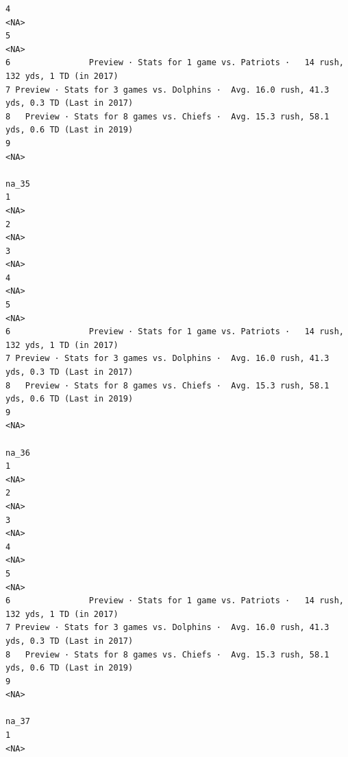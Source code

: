 \documentclass[
]{article}
\begin{document}
\begin{verbatim}
4                                                                                        <NA>
5                                                                                        <NA>
6                Preview · Stats for 1 game vs. Patriots ·   14 rush, 132 yds, 1 TD (in 2017)
7 Preview · Stats for 3 games vs. Dolphins ·  Avg. 16.0 rush, 41.3 yds, 0.3 TD (Last in 2017)
8   Preview · Stats for 8 games vs. Chiefs ·  Avg. 15.3 rush, 58.1 yds, 0.6 TD (Last in 2019)
9                                                                                        <NA>
                                                                                        na_35
1                                                                                        <NA>
2                                                                                        <NA>
3                                                                                        <NA>
4                                                                                        <NA>
5                                                                                        <NA>
6                Preview · Stats for 1 game vs. Patriots ·   14 rush, 132 yds, 1 TD (in 2017)
7 Preview · Stats for 3 games vs. Dolphins ·  Avg. 16.0 rush, 41.3 yds, 0.3 TD (Last in 2017)
8   Preview · Stats for 8 games vs. Chiefs ·  Avg. 15.3 rush, 58.1 yds, 0.6 TD (Last in 2019)
9                                                                                        <NA>
                                                                                        na_36
1                                                                                        <NA>
2                                                                                        <NA>
3                                                                                        <NA>
4                                                                                        <NA>
5                                                                                        <NA>
6                Preview · Stats for 1 game vs. Patriots ·   14 rush, 132 yds, 1 TD (in 2017)
7 Preview · Stats for 3 games vs. Dolphins ·  Avg. 16.0 rush, 41.3 yds, 0.3 TD (Last in 2017)
8   Preview · Stats for 8 games vs. Chiefs ·  Avg. 15.3 rush, 58.1 yds, 0.6 TD (Last in 2019)
9                                                                                        <NA>
                                                                                        na_37
1                                                                                        <NA>

\end{verbatim}
\end{document}
